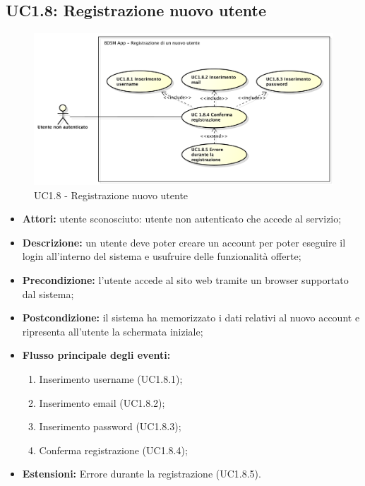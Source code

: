 \pagebreak


\subsection{UC1.8: Registrazione nuovo utente}

\begin{figure}[!htbp]
    \centering
    \centerline{\includegraphics[scale=0.45]{./images/UC1_8.pdf}}
    \caption{UC1.8 - Registrazione nuovo utente}
\end{figure}

\begin{itemize}
   	\item \textbf{Attori:} utente sconosciuto: utente non autenticato che accede al servizio;
    \item \textbf{Descrizione:} un utente deve poter creare un account per poter eseguire il login
    all'interno del sistema e usufruire delle funzionalità offerte;
    \item \textbf{Precondizione:} l'utente accede al sito web tramite un browser supportato
    dal sistema;
    \item \textbf{Postcondizione:} il sistema ha memorizzato i dati relativi al nuovo account e
    ripresenta all'utente la schermata iniziale;
    \item \textbf{Flusso principale degli eventi:}
    \begin{enumerate}
        \item Inserimento username (UC1.8.1);
        \item Inserimento email (UC1.8.2);
        \item Inserimento password (UC1.8.3);
        \item Conferma registrazione (UC1.8.4);
    \end{enumerate}
    \item \textbf{Estensioni:} Errore durante la registrazione (UC1.8.5).
\end{itemize}


